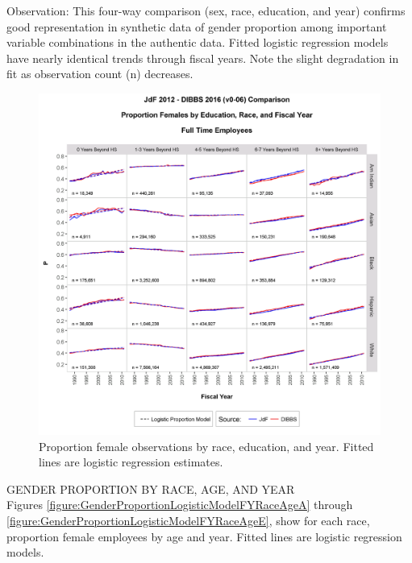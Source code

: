 \documentclass[10pt, letterpaper]{article}
\begin{document}
\begin{spacing}{1.0}
Observation:  This four-way comparison (sex, race, education, and year) confirms good representation in synthetic data of gender proportion among important variable combinations in the authentic data.  Fitted logistic regression models have nearly identical trends through fiscal years.  Note the slight degradation in fit as observation count (n) decreases.\\

\vspace{20pt}

\begin{figure}[h!]
    \centering
    \includegraphics[width=6.5in, trim={0 0 0 1in}, clip]{GenderProportionLogisticModelEducationRaceFYScaleFixedv0-06.png}
    \caption{Proportion female observations by race, education, and year.  Fitted lines are logistic regression estimates.}
    \label{figure:GenderProportionLogisticModelEducationRaceFYScaleFixedv0-06}
\end{figure}

\clearpage

GENDER PROPORTION BY RACE, AGE, AND YEAR\\

Figures \ref{figure:GenderProportionLogisticModelFYRaceAgeA} through \ref{figure:GenderProportionLogisticModelFYRaceAgeE}, show for each race, proportion female employees by age and year.  Fitted lines are logistic regression models.\\


\end{spacing}
\end{document}
